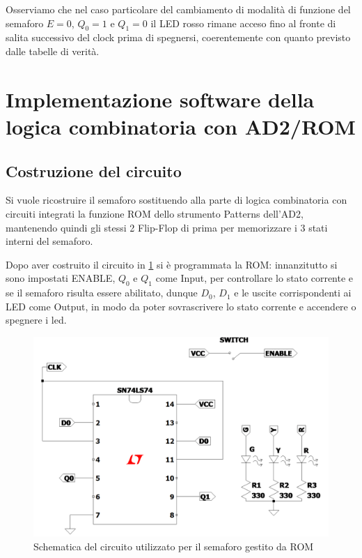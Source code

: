 \documentclass[10pt, a4paper, italian]{article}
\begin{document}
Osserviamo che nel caso particolare del cambiamento di modalità di funzione
del semaforo $E = 0$, $Q_0 = 1$ e $Q_1 = 0$ il LED rosso rimane acceso fino al
fronte di salita successivo del clock prima di spegnersi, coerentemente con
quanto previsto dalle tabelle di verità.

\section{Implementazione software della logica combinatoria con AD2/ROM}
\subsection{Costruzione del circuito}
Si vuole ricostruire il semaforo sostituendo alla parte di logica
combinatoria con circuiti integrati la funzione ROM dello strumento Patterns
dell'AD2, mantenendo quindi gli stessi 2 Flip-Flop di prima per memorizzare i
3 stati interni del semaforo.

Dopo aver costruito il circuito in \cref{schem: rom} si è programmata la ROM:
innanzitutto si sono impostati ENABLE, $Q_0$ e $Q_1$ come Input, per
controllare lo stato corrente e se il semaforo risulta essere abilitato, dunque
$D_0$, $D_1$ e le uscite corrispondenti ai LED come Output, in modo da poter
sovrascrivere lo stato corrente e accendere o spegnere i led.
\begin{figure}[htbp]
    \centering
    \includegraphics[width=\textwidth]{schem_rom}
    \caption{Schematica del circuito utilizzato per il semaforo gestito da ROM
    \label{schem: rom}}
\end{figure}
\end{document}
